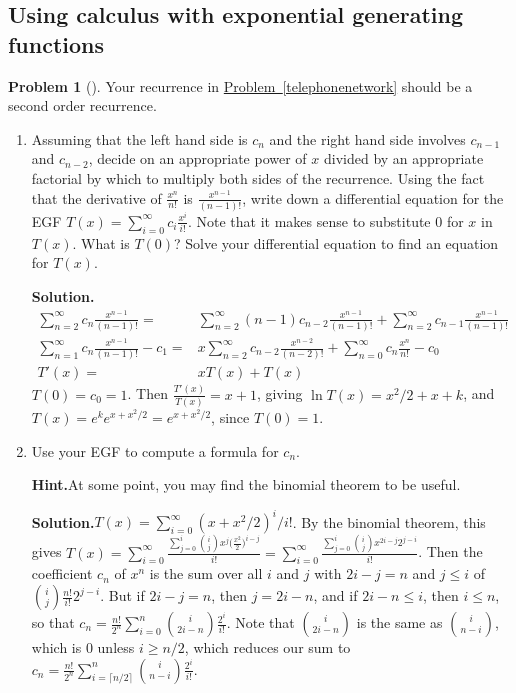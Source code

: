 \documentclass[10pt,]{book}
\theoremstyle{plain}
\theoremstyle{definition}
\newtheorem{activity}[project]{Problem}
\theoremstyle{definition}
\numberwithin{equation}{chapter}
\newcommand{\amp}{&}
\begin{document}
\subsection[{Using calculus  with exponential generating functions}]{Using calculus  with exponential generating functions}\label{subsection-69}
\begin{activity}[]\label{telephonenetworkEGF}
Your recurrence in \hyperref[telephonenetwork]{Problem~\ref{telephonenetwork}} should be a second order recurrence.%
\begin{enumerate}[font=\bfseries,label=(\alph*),ref=\alph*]
\item\label{task-258} Assuming that the left hand side is \(c_n\) and the right hand side involves \(c_{n-1}\) and \(c_{n-2}\), decide on an appropriate power of \(x\) divided by an appropriate factorial by which to multiply both sides of the recurrence.  Using the fact that the derivative of \(\frac{x^n}{n!}\) is \(\frac{x^{n-1}}{(n-1)!}\), write down a differential equation for the EGF \(T(x) =
\sum_{i=0}^\infty c_i\frac{x^i}{i!}\).  Note that it makes sense to substitute 0 for \(x\) in \(T(x)\).  What is \(T(0)\)?  Solve your differential equation to find an equation for \(T(x)\).%
\par\medskip\noindent%
\textbf{Solution.}\quad %
\begin{align*}
\sum_{n=2}^\infty c_n\frac{x^{n-1}}{(n-1)!}
\! =\amp \!\sum_{n=2}^\infty(n-1) c_{n-2}\frac{x^{n-1}}{(n-1)!} +
\sum_{n=2}^\infty c_{n-1}\frac{x^{n-1}}{(n-1)!}\\
\sum_{n=1}^\infty c_n\frac{x^{n-1}}{(n-1)!}- c_1 \! =\amp \! x\sum_{n=2}^\infty
c_{n-2}\frac{x^{n-2}}{(n-2)!} + \sum_{n=0}^\infty c_n\frac{x^n}{n!} -c_0\\
T'(x)\! =\amp \!xT(x) +T(x)
\end{align*}
\(T(0) = c_0 =1\). Then \(\frac{T'(x)}{T(x)} = x+1\), giving \(\ln T(x)
=x^2/2+x+k\), and \(T(x) =e^ke^{x+ x^2/2}=e^{x+x^2/2}\), since \(T(0)=1\).%
\item\label{task-259} Use your EGF to compute a formula for \(c_n\).%
\par\medskip\noindent%
\textbf{Hint.}\quad At some point, you may find the binomial theorem to be useful.%
\par\medskip\noindent%
\textbf{Solution.}\quad \(T(x) = \sum_{i=0}^\infty (x+x^2/2)^i/i!\). By the binomial theorem, this gives \(T(x) = \sum_{i=0}^\infty \frac{\sum_{j=0}^i \binom{i}{j}x^j\bigl(\frac{x^2}{2}\bigr)^{i-j}}{
i!}=\sum_{i=0}^\infty\frac{\sum_{j=0}^i\binom{i}{j}x^{2i-j}2^{j-i}}{i!}\). Then the coefficient \(c_n\) of \(x^n\) is the sum over all \(i\) and \(j\) with \(2i-j=n\) and \(j\le i\) of \(\binom{i}{j}\frac{n!}{i!}2^{j-i}\). But if \(2i-j=n\), then \(j= 2i-n\), and if \(2i-n\le i\), then \(i\le n\), so that \(c_n
= \frac{n!}{2^n}\sum_{i=0}^n\binom{i}{2i-n}\frac{2^i}{i!}\). Note that \(\binom{i}{2i-n}\) is the same as \(\binom{i}{n-i}\), which is 0 unless \(i\ge
n/2\), which reduces our sum to \(c_n = \frac{n!}{2^n}\sum_{i=\lceil n/2\rceil}^n\binom{i}{n-i}\frac{2^i}{i!}\).%
\end{enumerate}
\end{activity}
\end{document}
